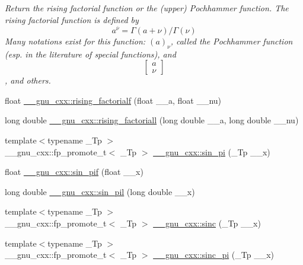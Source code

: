 \begin{DoxyCompactItemize}
\begin{DoxyCompactList}\small\item\em Return the rising factorial function or the (upper) Pochhammer function. The rising factorial function is defined by \[ a^{\overline{\nu}} = \Gamma(a + \nu) / \Gamma(\nu) \] Many notations exist for this function\+: $ (a)_\nu $, called the Pochhammer function (esp. in the literature of special functions), and \[ \left[ \begin{array}{c} a \\ \nu \end{array} \right] \], and others. \end{DoxyCompactList}\item 
float \hyperlink{group__gnu__math__spec__func_ga10da05b995a42f0b0625e61186af7449}{\+\_\+\+\_\+gnu\+\_\+cxx\+::rising\+\_\+factorialf} (float \+\_\+\+\_\+a, float \+\_\+\+\_\+nu)
\item 
long double \hyperlink{group__gnu__math__spec__func_gac9a399ae01c315aa78a64b445795d974}{\+\_\+\+\_\+gnu\+\_\+cxx\+::rising\+\_\+factoriall} (long double \+\_\+\+\_\+a, long double \+\_\+\+\_\+nu)
\item 
{\footnotesize template$<$typename \+\_\+\+Tp $>$ }\\\+\_\+\+\_\+gnu\+\_\+cxx\+::fp\+\_\+promote\+\_\+t$<$ \+\_\+\+Tp $>$ \hyperlink{group__gnu__math__spec__func_ga220f8a9a0477697cff96e84dc911d5f0}{\+\_\+\+\_\+gnu\+\_\+cxx\+::sin\+\_\+pi} (\+\_\+\+Tp \+\_\+\+\_\+x)
\item 
float \hyperlink{group__gnu__math__spec__func_ga74fc8e2dd770850e7ea8bf8a28a71777}{\+\_\+\+\_\+gnu\+\_\+cxx\+::sin\+\_\+pif} (float \+\_\+\+\_\+x)
\item 
long double \hyperlink{group__gnu__math__spec__func_ga0bda860961b0a121e266b278f260634b}{\+\_\+\+\_\+gnu\+\_\+cxx\+::sin\+\_\+pil} (long double \+\_\+\+\_\+x)
\item 
{\footnotesize template$<$typename \+\_\+\+Tp $>$ }\\\+\_\+\+\_\+gnu\+\_\+cxx\+::fp\+\_\+promote\+\_\+t$<$ \+\_\+\+Tp $>$ \hyperlink{group__gnu__math__spec__func_ga09976b5d041113979c93613cc3700348}{\+\_\+\+\_\+gnu\+\_\+cxx\+::sinc} (\+\_\+\+Tp \+\_\+\+\_\+x)
\item 
{\footnotesize template$<$typename \+\_\+\+Tp $>$ }\\\+\_\+\+\_\+gnu\+\_\+cxx\+::fp\+\_\+promote\+\_\+t$<$ \+\_\+\+Tp $>$ \hyperlink{group__gnu__math__spec__func_ga5195270024403b985e7d4f2f935f8779}{\+\_\+\+\_\+gnu\+\_\+cxx\+::sinc\+\_\+pi} (\+\_\+\+Tp \+\_\+\+\_\+x)

\end{DoxyCompactItemize}
